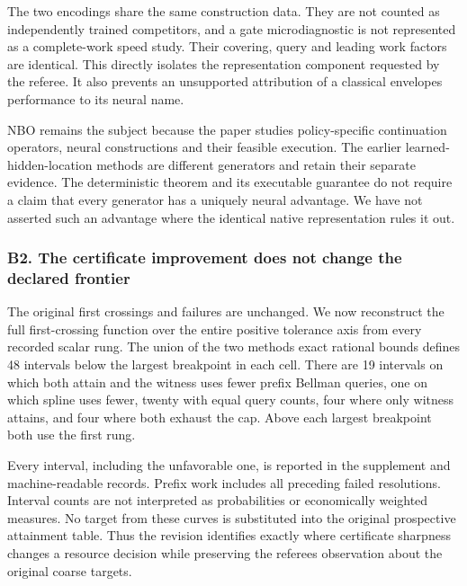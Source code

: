 \documentclass[ecta,nameyear,draft]{econsocart}
\begin{document}
The two encodings share the same construction data. They are not counted
as independently trained competitors, and a gate microdiagnostic is not
represented as a complete-work speed study. Their covering, query and
leading work factors are identical. This directly isolates the
representation component requested by the referee. It also prevents an
unsupported attribution of a classical envelope\textquotesingle s
performance to its neural name.

NBO remains the subject because the paper studies policy-specific
continuation operators, neural constructions and their feasible
execution. The earlier learned-hidden-location methods are different
generators and retain their separate evidence. The deterministic theorem
and its executable guarantee do not require a claim that every generator
has a uniquely neural advantage. We have not asserted such an advantage
where the identical native representation rules it out.

\hypertarget{b2-the-certificate-improvement-does-not-change-the-declared-frontier}{%
\subsubsection{B2. The certificate improvement does not change the
declared
frontier}\label{b2-the-certificate-improvement-does-not-change-the-declared-frontier}}

The original first crossings and failures are unchanged. We now
reconstruct the full first-crossing function over the entire positive
tolerance axis from every recorded scalar rung. The union of the two
methods\textquotesingle{} exact rational bounds defines 48 intervals
below the largest breakpoint in each cell. There are 19 intervals on
which both attain and the witness uses fewer prefix Bellman queries, one
on which spline uses fewer, twenty with equal query counts, four where
only witness attains, and four where both exhaust the cap. Above each
largest breakpoint both use the first rung.

Every interval, including the unfavorable one, is reported in the
supplement and machine-readable records. Prefix work includes all
preceding failed resolutions. Interval counts are not interpreted as
probabilities or economically weighted measures. No target from these
curves is substituted into the original prospective attainment table.
Thus the revision identifies exactly where certificate sharpness changes
a resource decision while preserving the referee\textquotesingle s
observation about the original coarse targets.
\end{document}
